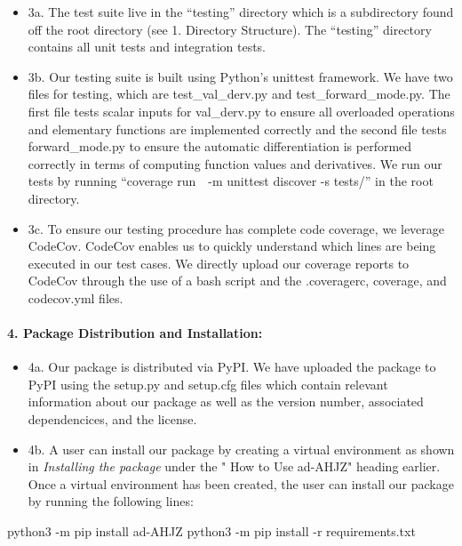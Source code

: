 \documentclass[11pt]{article}
\newenvironment{Shaded}{}{}
\newcommand{\NormalTok}[1]{{#1}}
\newcommand{\ExtensionTok}[1]{{#1}}
\begin{document}
\begin{itemize}
\item
  3a. The test suite live in the ``testing'' directory which is a
  subdirectory found off the root directory (see 1. Directory
  Structure). The ``testing'' directory contains all unit tests and
  integration tests.
\item
  3b. Our testing suite is built using Python's unittest framework. We
  have two files for testing, which are test\_val\_derv.py and
  test\_forward\_mode.py. The first file tests scalar inputs for
  val\_derv.py to ensure all overloaded operations and elementary
  functions are implemented correctly and the second file tests
  forward\_mode.py to ensure the automatic differentiation is performed
  correctly in terms of computing function values and derivatives. We
  run our tests by running ``coverage run~~-m unittest discover -s
  tests/'' in the root directory.
\item
  3c. To ensure our testing procedure has complete code coverage, we
  leverage CodeCov. CodeCov enables us to quickly understand which lines
  are being executed in our test cases. We directly upload our coverage
  reports to CodeCov through the use of a bash script and the
  .coveragerc, coverage, and codecov.yml files.
\end{itemize}

\hypertarget{package-distribution-and-installation}{%
\paragraph{\texorpdfstring{4. \textbf{Package Distribution and
Installation:}}{4. Package Distribution and Installation:}}\label{package-distribution-and-installation}}

\begin{itemize}
\item
  4a. Our package is distributed via PyPI. We have uploaded the package
  to PyPI using the setup.py and setup.cfg files which contain relevant
  information about our package as well as the version number,
  associated dependencices, and the license.
\item
  4b. A user can install our package by creating a virtual environment
  as shown in \emph{Installing the package} under the " How to Use
  ad-AHJZ" heading earlier. Once a virtual environment has been created,
  the user can install our package by running the following lines:
\end{itemize}

\begin{Shaded}
\begin{Highlighting}[]
\ExtensionTok{python3}\NormalTok{ -m pip install ad-AHJZ}
\ExtensionTok{python3}\NormalTok{ -m pip install -r requirements.txt}
\end{Highlighting}
\end{Shaded}
\end{document}
